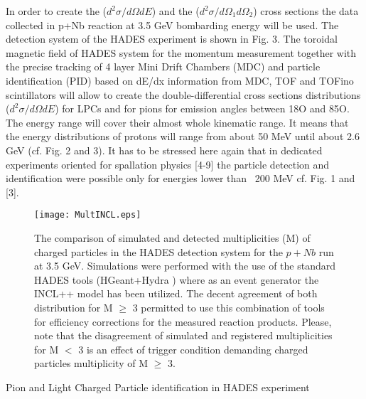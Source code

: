  

 



In order to create the ($d^2\sigma/d\Omega dE$) and the ($d^2\sigma/d\Omega_1 d\Omega_2$) cross sections the data collected in p+Nb reaction at 3.5 GeV bombarding energy will be used.  The detection system of the HADES experiment is shown in Fig. 3. 
The toroidal magnetic field of HADES system for the momentum measurement together with the precise tracking of 4 layer Mini Drift Chambers (MDC) and particle identification (PID) based on dE/dx information from MDC, TOF and TOFino scintillators will allow to create the double-differential cross sections distributions ($d^2\sigma/d\Omega dE$) for LPCs and for pions for emission angles between 18O and 85O. The energy range will cover their almost whole kinematic range. It means that the energy distributions of protons will range from about 50 MeV until about 2.6 GeV (cf. Fig. 2 and 3). It has to be stressed here again that in dedicated experiments oriented for spallation physics [4-9] the particle detection and identification were possible only for energies lower than ~200 MeV cf. Fig. 1 and [3].  
\begin{figure}
	\centering
	\texttt{[image: MultINCL.eps]}
	\caption{\label{Eff_simulations} The comparison of simulated and detected multiplicities (M) of charged particles in the HADES 
detection system for the $p+Nb$ run at 3.5 GeV. Simulations were performed with the use of the standard HADES tools 
(HGeant+Hydra \cite{}) where as an event generator the INCL++ model has been utilized. The decent agreement of both 
distribution for M $\ge$ 3 permitted to use this combination of tools for efficiency corrections for the measured reaction 
products. Please, note that the disagreement of simulated and registered multiplicities for M $<$ 3 is an effect of 
trigger condition demanding charged particles multiplicity of M $\ge$ 3. 
}
\end{figure}
Pion and Light Charged Particle identification in HADES experiment 

